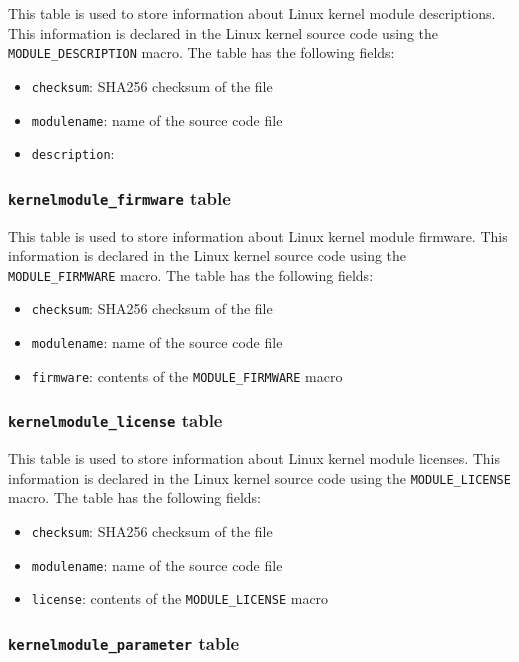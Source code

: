 \documentclass[10pt,a4paper]{article}
\begin{document}
This table is used to store information about Linux kernel module descriptions.
This information is declared in the Linux kernel source code using the
\texttt{MODULE\_DESCRIPTION} macro. The table has the following fields:

\begin{itemize}
\item \texttt{checksum}: SHA256 checksum of the file
\item \texttt{modulename}: name of the source code file
\item \texttt{description}:
\end{itemize}

\subsubsection{\texttt{kernelmodule\_firmware} table}

This table is used to store information about Linux kernel module firmware.
This information is declared in the Linux kernel source code using the
\texttt{MODULE\_FIRMWARE} macro. The table has the following fields:

\begin{itemize}
\item \texttt{checksum}: SHA256 checksum of the file
\item \texttt{modulename}: name of the source code file
\item \texttt{firmware}: contents of the \texttt{MODULE\_FIRMWARE} macro
\end{itemize}

\subsubsection{\texttt{kernelmodule\_license} table}

This table is used to store information about Linux kernel module licenses.
This information is declared in the Linux kernel source code using the
\texttt{MODULE\_LICENSE} macro. The table has the following fields:

\begin{itemize}
\item \texttt{checksum}: SHA256 checksum of the file
\item \texttt{modulename}: name of the source code file
\item \texttt{license}: contents of the \texttt{MODULE\_LICENSE} macro
\end{itemize}

\subsubsection{\texttt{kernelmodule\_parameter} table}
\end{document}
